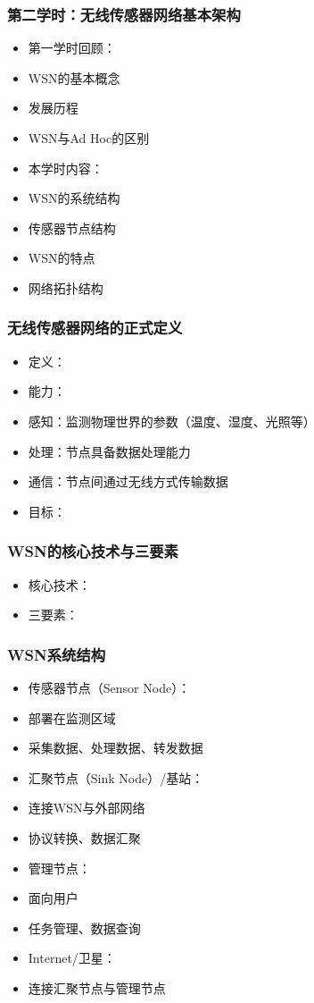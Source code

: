 \documentclass[aspectratio=43]{beamer}
\begin{document}
\begin{frame}
  \frametitle{第二学时：无线传感器网络基本架构}

  \begin{itemize}
  \item<+-> 第一学时回顾：
  \item<+-> WSN的基本概念
  \item<+-> 发展历程
  \item<+-> WSN与Ad Hoc的区别
  \item<+-> 本学时内容：
  \item<+-> WSN的系统结构
  \item<+-> 传感器节点结构
  \item<+-> WSN的特点
  \item<+-> 网络拓扑结构
  \end{itemize}
\end{frame}

\begin{frame}
  \frametitle{无线传感器网络的正式定义}

  \begin{itemize}
  \item<+-> 定义：
  \item<+-> 能力：
  \item<+-> 感知：监测物理世界的参数（温度、湿度、光照等）
  \item<+-> 处理：节点具备数据处理能力
  \item<+-> 通信：节点间通过无线方式传输数据
  \item<+-> 目标：
  \end{itemize}
\end{frame}

\begin{frame}
  \frametitle{WSN的核心技术与三要素}

  \begin{itemize}
  \item<+-> 核心技术：
  \item<+-> 三要素：
  \end{itemize}
\end{frame}

\begin{frame}
  \frametitle{WSN系统结构}

  \begin{itemize}
  \item<+-> 传感器节点（Sensor Node）：
  \item<+-> 部署在监测区域
  \item<+-> 采集数据、处理数据、转发数据
  \item<+-> 汇聚节点（Sink Node）/基站：
  \item<+-> 连接WSN与外部网络
  \item<+-> 协议转换、数据汇聚
  \item<+-> 管理节点：
  \item<+-> 面向用户
  \item<+-> 任务管理、数据查询
  \item<+-> Internet/卫星：
  \item<+-> 连接汇聚节点与管理节点
  \end{itemize}
\end{frame}
\end{document}
